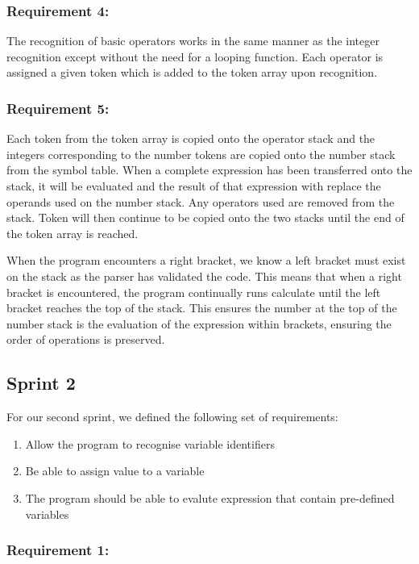 \documentclass[a4paper, oneside, 11pt]{report}
\begin{document}
\subsubsection{Requirement 4: }

The recognition of basic operators works in the same manner as the integer recognition except without the need for a looping function. Each operator is assigned a given token which is added to the token array upon recognition. 

\subsubsection{Requirement 5: }

Each token from the token array is copied onto the operator stack and the integers corresponding to the number tokens are copied onto the number stack from the symbol table. When a complete expression has been transferred onto the stack, it will be evaluated and the result of that expression with replace the operands used on the number stack. Any operators used are removed from the stack. Token will then continue to be copied onto the two stacks until the end of the token array is reached.  

When the program encounters a right bracket, we know a left bracket must exist on the stack as the parser has validated the code. This means that when a right bracket is encountered, the program continually runs calculate until the left bracket reaches the top of the stack. This ensures the number at the top of the number stack is the evaluation of the expression within brackets, ensuring the order of operations is preserved. 

\subsection{Sprint 2}

For our second sprint, we defined the following set of requirements: 

\begin{enumerate}
\item Allow the program to recognise variable identifiers
\item Be able to assign value to a variable
\item The program should be able to evalute expression that contain pre-defined variables
\end{enumerate}

\subsubsection{Requirement 1: }
\end{document}
